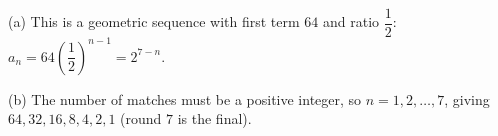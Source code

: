 (a) This is a geometric sequence with first term $64$ and ratio $\dfrac12$: $a_n=64\left(\dfrac12\right)^{n-1}=\boxed{2^{7-n}}$.

(b) The number of matches must be a positive integer, so $n=1,2,\dots,7$, giving $64,32,16,8,4,2,1$ (round $7$ is the final).
